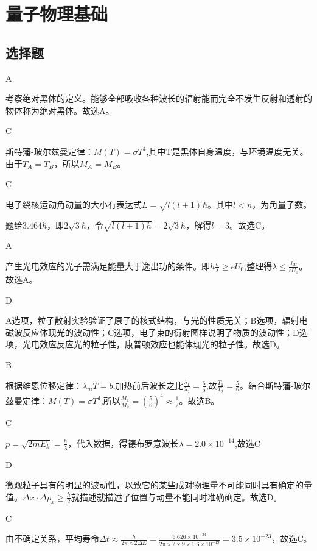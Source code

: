 \chapter{量子物理基础}

\section{选择题}
\exercise A

\solve 考察绝对黑体的定义。能够全部吸收各种波长的辐射能而完全不发生反射和透射的物体称为绝对黑体。故选A。

\exercise C

\solve 斯特藩-玻尔兹曼定律：$M(T)=\sigma T^4$,其中T是黑体自身温度，与环境温度无关。由于$T_A=T_B$，所以$M_A=M_B$。

\exercise C

\solve 电子绕核运动角动量的大小有表达式$L=\sqrt{l(l+1)}\hbar$。其中$l<n$，为角量子数。%

题给$3.464\hbar$，即$2\sqrt{3}\hbar$，令$\sqrt{l(l+1)h}=2\sqrt{3}\hbar$，解得$l=3$。故选C。

\exercise A

\solve 产生光电效应的光子需满足能量大于逸出功的条件。即$h\frac{c}{\lambda}\ge eU_0$,整理得$\lambda \le\frac{hc}{eU_0}$。故选A。

\exercise D

\solve A选项，\alpha 粒子散射实验验证了原子的核式结构，与光的性质无关；B选项，辐射电磁波反应体现光的波动性；C选项，电子束的衍射图样说明了物质的波动性；D选项，光电效应反应光的粒子性，康普顿效应也能体现光的粒子性。故选D。

\exercise B

\solve 根据维恩位移定律：$\lambda_mT=b$,加热前后波长之比$\frac{\lambda_1}{\lambda_2}=\frac{6}{5}$,故$\frac{T_1}{T_2}=\frac{5}{6}$。结合斯特藩-玻尔兹曼定律：$M(T)=\sigma T^4$,所以$\frac{M_1}{M_2}=(\frac{5}{6})^4\approx\frac{1}{2}$。故选B。

\exercise C

\solve $p=\sqrt{2mE_k}=\frac{h}{\lambda}$，代入数据，得德布罗意波长$\lambda=2.0\times10^{-14}$,故选C

\exercise D

\solve 微观粒子具有的明显的波动性，以致它的某些成对物理量不可能同时具有确定的量值。$\Delta x\cdot \Delta p_x \geqslant \frac{\hbar}{2}$就描述就描述了位置与动量不能同时准确确定。故选D。

\exercise C

\solve 由不确定关系，平均寿命$\Delta t\approx\frac{\hbar}{2\pi\times2\Delta E}=\frac{6.626\times10^{-34}}{2\pi\times2\times9\times1.6\times10^{-19}}=3.5\times10^{-23}$，故选C。

